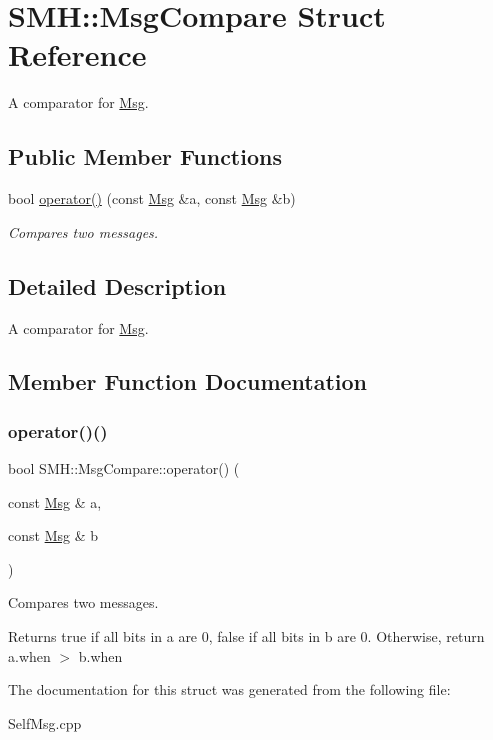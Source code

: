 \hypertarget{struct_s_m_h_1_1_msg_compare}{}\section{S\+MH\+:\+:Msg\+Compare Struct Reference}
\label{struct_s_m_h_1_1_msg_compare}


A comparator for \hyperlink{struct_s_m_h_1_1_msg}{Msg}.  


\subsection*{Public Member Functions}
\begin{DoxyCompactItemize}
\item 
bool \hyperlink{struct_s_m_h_1_1_msg_compare_afa4a56eba642be97adc3af0665588479}{operator()} (const \hyperlink{struct_s_m_h_1_1_msg}{Msg} \&a, const \hyperlink{struct_s_m_h_1_1_msg}{Msg} \&b)
\begin{DoxyCompactList}\small\item\em Compares two messages. \end{DoxyCompactList}\end{DoxyCompactItemize}


\subsection{Detailed Description}
A comparator for \hyperlink{struct_s_m_h_1_1_msg}{Msg}. 

\subsection{Member Function Documentation}
\mbox{\label{struct_s_m_h_1_1_msg_compare_afa4a56eba642be97adc3af0665588479}} 
\subsubsection{\texorpdfstring{operator()()}{operator()()}}
{\footnotesize\ttfamily bool S\+M\+H\+::\+Msg\+Compare\+::operator() (\begin{DoxyParamCaption}\item[{const \hyperlink{struct_s_m_h_1_1_msg}{Msg} \&}]{a,  }\item[{const \hyperlink{struct_s_m_h_1_1_msg}{Msg} \&}]{b }\end{DoxyParamCaption})\hspace{0.3cm}{\ttfamily [inline]}}



Compares two messages. 

Returns true if all bits in a are 0, false if all bits in b are 0. Otherwise, return a.\+when $>$ b.\+when 

The documentation for this struct was generated from the following file\+:\begin{DoxyCompactItemize}
\item 
Self\+Msg.\+cpp\end{DoxyCompactItemize}
